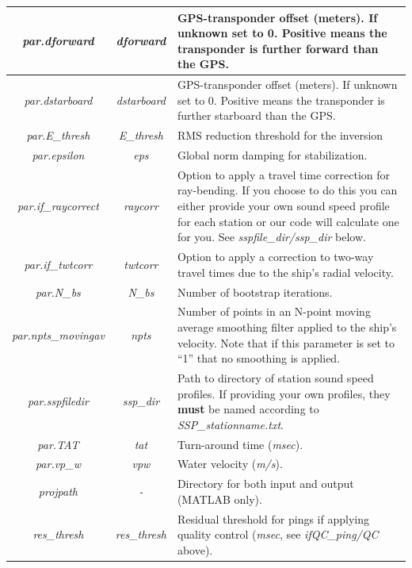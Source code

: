 \documentclass[titlepage, 12pt]{article}
\begin{document}
\begin{table}[H]
\begin{tabularx}{\linewidth}{|c|c|X|}
    \textit{par.dforward}       & \textit{dforward}          & GPS-transponder offset (meters). If unknown set to 0. Positive means the transponder is further forward than the GPS. \\ \hline
    \textit{par.dstarboard}     & \textit{dstarboard}        & GPS-transponder offset (meters). If unknown set to 0. Positive means the transponder is further starboard than the GPS. \\ \hline
    \textit{par.E\_thresh}      & \textit{E\_thresh}         & RMS reduction threshold for the inversion \\ \hline
    \textit{par.epsilon}        & \textit{eps}               & Global norm damping for stabilization.\\ \hline
    \textit{par.if\_raycorrect} & \textit{raycorr}           & Option to apply a travel time correction for ray-bending. If you choose to do this you can either provide your own sound speed profile for each station or our code will calculate one for you. See \textit{sspfile\_dir/ssp\_dir} below. \\ \hline
    \textit{par.if\_twtcorr}    & \textit{twtcorr}           & Option to apply a correction to two-way travel times due to the ship's radial velocity.\\ \hline
    \textit{par.N\_bs}          & \textit{N\_bs}             & Number of bootstrap iterations.\\ \hline
    \textit{par.npts\_movingav} & \textit{npts}              & Number of points in an N-point moving average smoothing filter applied to the ship's velocity. Note that if this parameter is set to “1” that no smoothing is applied.\\ \hline
    \textit{par.sspfiledir}     & \textit{ssp\_dir}          & Path to directory of station sound speed profiles. If providing your own profiles, they \textbf{must} be named according to \textit{SSP\_stationname.txt}. \\ \hline
    \textit{par.TAT}            & \textit{tat}               & Turn-around time (\textit{msec}).\\ \hline
    \textit{par.vp\_w}          & \textit{vpw}               & Water velocity (\textit{m/s}).\\ \hline
    \textit{projpath}           & \textit{-}                 & Directory for both input and output (MATLAB only).\\ \hline
    \textit{res\_thresh}        & \textit{res\_thresh}       & Residual threshold for pings if applying quality control (\textit{msec}, see \textit{ifQC\_ping/QC} above).\\ \hline
   \end{tabularx}
  \end{table}
\end{document}

